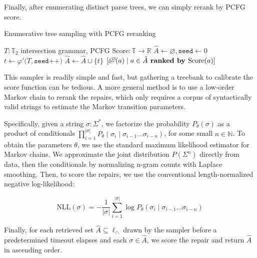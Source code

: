 \documentclass[sigplan,acmsmall,nonacm,screen]{acmart}\settopmatter{printfolios=false,printccs=false,printacmref=false}
\begin{document}
Finally, after enumerating distinct parse trees, we can simply rerank by PCFG score.

\begin{algorithm}[H]
\caption{Enumerative tree sampling with PCFG reranking}
\label{alg:enum_pcfg}
\begin{algorithmic}[1]
\Require $T: \mathbb{T}_2$ intersection grammar, PCFG Score$: \mathbb{T} \rightarrow \mathbb{R}$
\State $\hat{A} \gets \varnothing, \texttt{seed} \gets 0$ 
\State $t \gets \varphi'\big(T, \texttt{seed++})$ 
\State $\hat{A} \gets \hat{A} \cup \{t\}$
\EndFor
\State \Return $[\text{\textleaf}(a) \mid a \in \hat{A} \textbf{ ranked by } \text{Score}(a)]$ 
\end{algorithmic}
\end{algorithm}

This sampler is readily simple and fast, but gathering a treebank to calibrate the score function can be tedious. A more general method is to use a low-order Markov chain to rerank the repairs, which only requires a corpus of syntactically valid strings to estimate the Markov transition parameters.

Specifically, given a string $\sigma: \Sigma^*$, we factorize the probability $P_\theta(\sigma)$ as a product of conditionals $\prod_{i=1}^{|\sigma|}P_\theta(\sigma_i \mid \sigma_{i-1}\ldots\sigma_{i-n})$, for some small $n \in \mathbb{N}$. To obtain the parameters $\theta$, we use the standard maximum likelihood estimator for Markov chains. We approximate the joint distribution $P(\Sigma^n)$ directly from data, then the conditionals by normalizing n-gram counts with Laplace smoothing. Then, to score the repairs, we use the conventional length-normalized negative log-likelihood:

\begin{equation}
\text{NLL}(\sigma) = -\frac{1}{|\sigma|}\sum_{i=1}^{|\sigma|}\log P_\theta(\sigma_i \mid \sigma_{i-1}\ldots\sigma_{i-n})
\end{equation}

Finally, for each retrieved set $\hat{A} \subseteq \ell_\cap$ drawn by the sampler before a predetermined timeout elapses and each $\sigma \in \hat{A}$, we score the repair and return $\hat{A}$ in ascending order.
\end{document}
